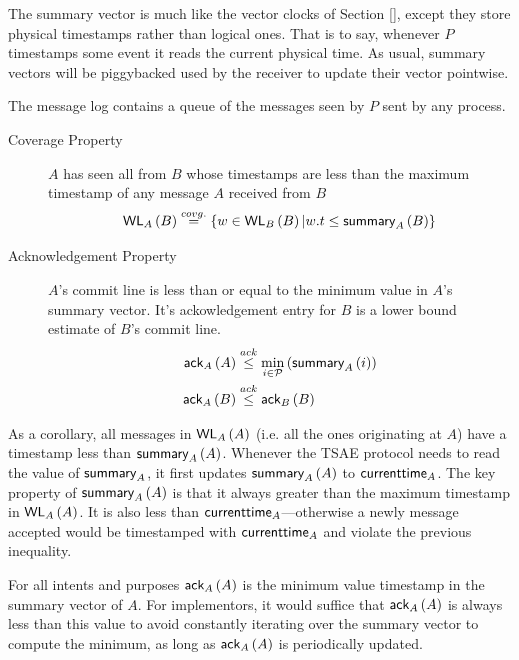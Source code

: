 \documentclass[]             %
{NASA}                       %
\theoremstyle{definition}
\begin{document}
The summary vector is much like the vector clocks of Section \ref{},
except they store physical timestamps rather than logical ones. That
is to say, whenever $P$ timestamps some event it reads the current
physical time. As usual, summary vectors will be piggybacked used by
the receiver to update their vector pointwise.

The message log contains a queue of the messages seen by $P$ sent by
any process.



\begin{description}
\item[Coverage Property] $A$ has seen all from $B$ whose timestamps are less
  than the maximum timestamp of any message $A$ received from $B$
  \[ \textsf{WL}_{A}\left(B\right) \overset{covg.}{=} \{w \in \textsf{WL}_{B}\left(B\right) | w.t \leq \textsf{summary}_{A}\left(B\right) \} \]
\item[Acknowledgement Property] $A$'s commit line is less than or equal to the minimum value in $A$'s summary vector. It's ackowledgement entry for $B$ is a lower bound estimate of $B$'s commit line.
  \begin{align*}
    \textsf{ack}_{A}\left(A\right) &\overset{ack}{\leq} \min_{i \in \mathcal{P}} \left(\textsf{summary}_{A}\left(i\right)\right) \\
    \textsf{ack}_{A}\left(B\right) &\overset{ack}{\leq} \textsf{ack}_{B}\left(B\right)
  \end{align*}
\end{description}

As a corollary, all messages in $\textsf{WL}_{A}\left(A\right)$ (i.e. all the ones
originating at $A$) have a timestamp less than
$\textsf{summary}_{A}\left(A\right)$. Whenever the TSAE protocol needs to read the value
of $\textsf{summary}_{A}$, it first updates $\textsf{summary}_{A}\left(A\right)$ to
$\textsf{currenttime}_{A}$. The key property of $\textsf{summary}_{A}\left(A\right)$ is that it
always greater than the maximum timestamp in $\textsf{WL}_{A}\left(A\right)$. It is also
less than $\textsf{currenttime}_{A}$---otherwise a newly message accepted would
be timestamped with $\textsf{currenttime}_{A}$ and violate the previous
inequality.

For all intents and purposes $\textsf{ack}_{A}\left(A\right)$ is the minimum value
timestamp in the summary vector of $A$. For implementors, it would
suffice that $\textsf{ack}_{A}\left(A\right)$ is always less than this value to avoid
constantly iterating over the summary vector to compute the minimum,
as long as $\textsf{ack}_{A}\left(A\right)$ is periodically updated.
\end{document}

